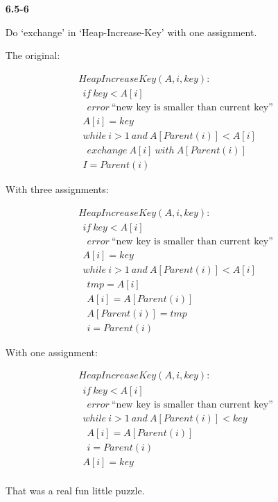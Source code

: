 \documentclass{article}
\begin{document}
\begin{enumerate}

\item[\textbf{6.5-6}]

Do `exchange' in `Heap-Increase-Key' with one assignment.

The original:

\begin{align*}
& HeapIncreaseKey(A, i, key): \\
& \ \ if\ key < A[i] \\
& \ \ \ \ error \ \text{``new key is smaller than current key''} \\
& \ \ A[i] = key \\
& \ \ while\ i > 1\ and\ A[Parent(i)] < A[i] \\
& \ \ \ \ exchange\ A[i]\ with\ A[Parent(i)] \\
& \ \ I = Parent(i)
\end{align*}

With three assignments:

\begin{align*}
& HeapIncreaseKey(A, i, key): \\
& \ \ if\ key < A[i] \\
& \ \ \ \ error \ \text{``new key is smaller than current key''} \\
& \ \ A[i] = key \\
& \ \ while\ i > 1\ and\ A[Parent(i)] < A[i] \\
& \ \ \ \ tmp = A[i] \\
& \ \ \ \ A[i] = A[Parent(i)] \\
& \ \ \ \ A[Parent(i)] = tmp \\
& \ \ \ \ i = Parent(i)
\end{align*}

With one assignment:

\begin{align*}
& HeapIncreaseKey(A, i, key): \\
& \ \ if\ key < A[i] \\
& \ \ \ \ error \ \text{``new key is smaller than current key''} \\
& \ \ while\ i > 1\ and\ A[Parent(i)] < key \\
& \ \ \ \ A[i] = A[Parent(i)] \\
& \ \ \ \ i = Parent(i) \\
& \ \ A[i] = key \\
\end{align*}

That was a real fun little puzzle.


\end{enumerate}
\end{document}
